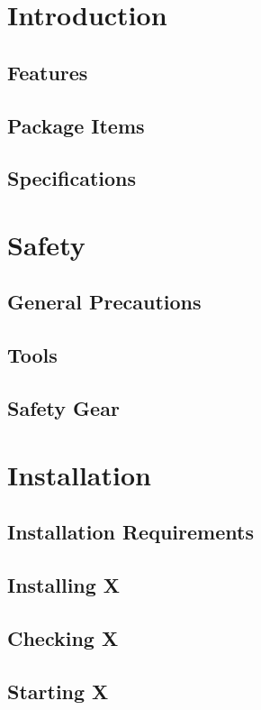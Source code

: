 \documentclass[10pt, openany, english, template]{hzguide}
\begin{document}
\frontmatter*
\FrontCover
\tableofcontents

\mainmatter*
\chapter{Introduction}\tplpara
\section{Features}\tpllist
\section{Package Items}\tplimagetable
\section{Specifications}\tplspectables

\chapter{Safety}
\section{General Precautions}\tpllist[itemize][itemize]
\section{Tools}\tplimagetable
\section{Safety Gear}\tplimagetable

\chapter{Installation}
\section{Installation Requirements}\tpllist
\section{Installing X}\tplprocedure[5]
\section{Checking X}\tplprocedure
\section{Starting X}\tpllist*
\end{document}
